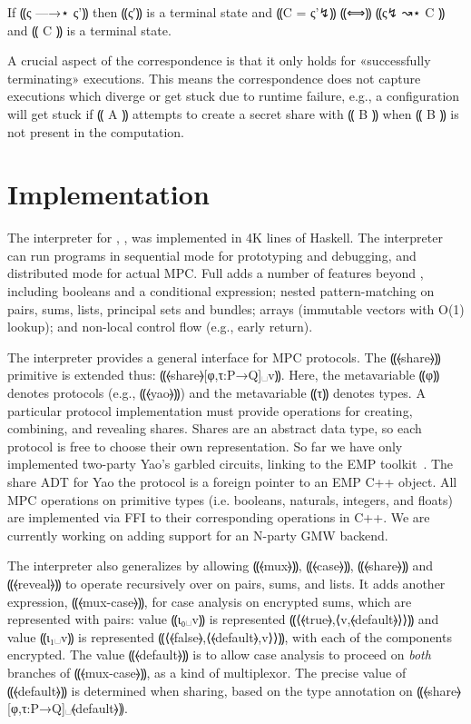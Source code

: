 \begin{theorem}\label{thm:mpc-simulation}
  If ⸨ς —→⋆ ς'⸩ then ⸨ς′⸩ is a terminal state and ⸨C = ς'↯⸩ ⸨⟺⸩ ⸨ς↯ ↝⋆ C ⸩ and ⸨ C ⸩ is a terminal state.
\end{theorem}

A crucial aspect of the correspondence is that it only
holds for «successfully terminating» executions. This means the correspondence
 does not capture executions which diverge or get stuck due to runtime failure,
 e.g., a configuration will get stuck if ⸨ A ⸩ attempts to create a secret share
 with ⸨ B ⸩ when ⸨ B ⸩ is not present in the computation.

\section{Implementation}
\label{sec:mpc-impl}

The interpreter for \mpc, \system, was implemented in 4K lines of Haskell. The
interpreter can run programs in sequential mode for prototyping and debugging,
and distributed mode for actual MPC\@.
%
Full \system adds a number of features beyond \mpc, including booleans and a conditional
expression; nested pattern-matching on pairs, sums, lists, principal
sets and bundles;
arrays (immutable vectors with O(1) lookup); and
non-local control flow (e.g., early return).

The \system interpreter provides a general interface for MPC
protocols. The ⸨⦑share⦒⸩ primitive is extended thus:
⸨⦑share⦒[φ,τ:P→Q]␣v⸩. Here, the metavariable ⸨φ⸩ denotes protocols
(e.g., ⸨⦑yao⦒⸩) and the metavariable ⸨τ⸩ denotes types. A
particular protocol implementation must provide operations for creating, combining,
and revealing shares. Shares are an abstract data type, so each protocol is free to
choose their own representation. So far we have only implemented
two-party Yao's garbled circuits, linking to the EMP toolkit~\cite{emp-toolkit}.
The share ADT for Yao the protocol is a foreign pointer to
an EMP C++ object. All MPC operations on primitive types (i.e. booleans,
naturals, integers, and floats) are implemented via FFI to their
corresponding operations in C++. We are currently working on adding
support for an N-party GMW backend.

The interpreter also generalizes \mpc
by allowing ⸨⦑mux⦒⸩, ⸨⦑case⦒⸩, ⸨⦑share⦒⸩ and ⸨⦑reveal⦒⸩ to operate
recursively over on pairs, sums, and lists. It adds another expression,
⸨⦑mux-case⦒⸩, for case analysis on encrypted sums, which are
represented with pairs: \mpc value ⸨ι₀␣v⸩ is represented
⸨⟨⦑true⦒,⟨v,⦑default⦒⟩⟩⸩ and value ⸨ι₁␣v⸩ is represented
⸨⟨⦑false⦒,⟨⦑default⦒,v⟩⟩⸩, with each of the components encrypted. The value
⸨⦑default⦒⸩ is to allow case analysis to proceed on \emph{both} branches of
⸨⦑mux-case⦒⸩, as a kind of multiplexor. The precise value of ⸨⦑default⦒⸩ is
determined when sharing, based on the type annotation on
⸨⦑share⦒[φ{,}τ{:}P{→}Q]␣⦑default⦒⸩.

